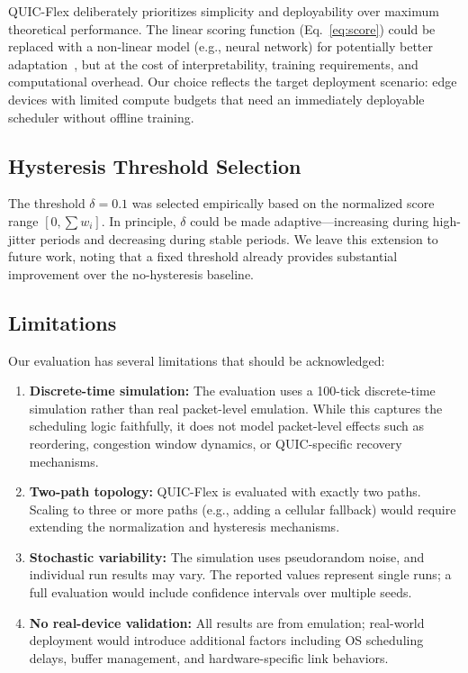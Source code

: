 \documentclass[conference,10pt]{IEEEtran}
\begin{document}
QUIC-Flex deliberately prioritizes simplicity and deployability over maximum theoretical performance.
The linear scoring function (Eq.~\ref{eq:score}) could be replaced with a non-linear model (e.g., neural network) for potentially better adaptation~\cite{zheng2025mpquic}, but at the cost of interpretability, training requirements, and computational overhead.
Our choice reflects the target deployment scenario: edge devices with limited compute budgets that need an immediately deployable scheduler without offline training.

\subsection{Hysteresis Threshold Selection}

The threshold $\delta = 0.1$ was selected empirically based on the normalized score range $[0, \sum w_i]$.
In principle, $\delta$ could be made adaptive—increasing during high-jitter periods and decreasing during stable periods.
We leave this extension to future work, noting that a fixed threshold already provides substantial improvement over the no-hysteresis baseline.

\subsection{Limitations}

Our evaluation has several limitations that should be acknowledged:

\begin{enumerate}
    \item \textbf{Discrete-time simulation:} The evaluation uses a 100-tick discrete-time simulation rather than real packet-level emulation.
    While this captures the scheduling logic faithfully, it does not model packet-level effects such as reordering, congestion window dynamics, or QUIC-specific recovery mechanisms.

    \item \textbf{Two-path topology:} QUIC-Flex is evaluated with exactly two paths.
    Scaling to three or more paths (e.g., adding a cellular fallback) would require extending the normalization and hysteresis mechanisms.

    \item \textbf{Stochastic variability:} The simulation uses pseudorandom noise, and individual run results may vary.
    The reported values represent single runs; a full evaluation would include confidence intervals over multiple seeds.

    \item \textbf{No real-device validation:} All results are from emulation; real-world deployment would introduce additional factors including OS scheduling delays, buffer management, and hardware-specific link behaviors.
\end{enumerate}
\end{document}
